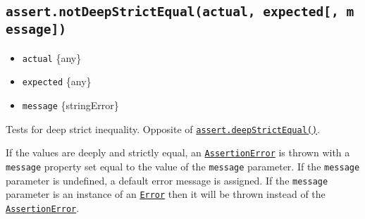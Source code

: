 \subsection{\texorpdfstring{\texttt{assert.notDeepStrictEqual(actual,\ expected{[},\ message{]})}}{assert.notDeepStrictEqual(actual, expected{[}, message{]})}}\label{assert.notdeepstrictequalactual-expected-message}

\begin{itemize}
\tightlist
\item
  \texttt{actual} \{any\}
\item
  \texttt{expected} \{any\}
\item
  \texttt{message} \{string\textbar Error\}
\end{itemize}

Tests for deep strict inequality. Opposite of
\hyperref[assertdeepstrictequalactual-expected-message]{\texttt{assert.deepStrictEqual()}}.

\begin{Shaded}
\begin{Highlighting}[]
 \OperatorTok{;}

\NormalTok{(\{ }\OperatorTok{:} \NormalTok{ \}}\OperatorTok{,}\NormalTok{ \{ }\OperatorTok{:} \StringTok{\textquotesingle{}1\textquotesingle{}}\NormalTok{ \})}\OperatorTok{;}
\end{Highlighting}
\end{Shaded}

\begin{Shaded}
\begin{Highlighting}[]
\OperatorTok{=} \NormalTok{(}\NormalTok{)}\OperatorTok{;}

\NormalTok{(\{ }\OperatorTok{:} \NormalTok{ \}}\OperatorTok{,}\NormalTok{ \{ }\OperatorTok{:} \StringTok{\textquotesingle{}1\textquotesingle{}}\NormalTok{ \})}\OperatorTok{;}
\end{Highlighting}
\end{Shaded}

If the values are deeply and strictly equal, an
\hyperref[class-assertassertionerror]{\texttt{AssertionError}} is thrown
with a \texttt{message} property set equal to the value of the
\texttt{message} parameter. If the \texttt{message} parameter is
undefined, a default error message is assigned. If the \texttt{message}
parameter is an instance of an
\href{errors.md\#class-error}{\texttt{Error}} then it will be thrown
instead of the
\hyperref[class-assertassertionerror]{\texttt{AssertionError}}.

